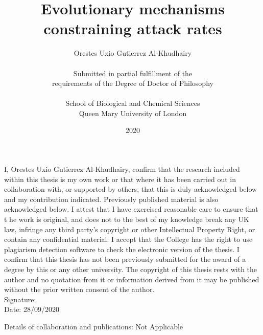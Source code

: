 \documentclass[a4paper]{report}
\def\setcounter#1#2{}
\begin{document}

\title{Evolutionary mechanisms constraining attack rates}
\author{Orestes Uxio Gutierrez Al-Khudhairy \\
\\
Submitted in partial fulfillment of the \\
requirements of the Degree of Doctor of Philosophy\\
\\
School of Biological and Chemical Sciences\\
Queen Mary University of London
}

\date{2020}

\setcounter{page}{1}
\maketitle

\newpage

I, Orestes Uxio Gutierrez Al-Khudhairy, confirm that the research included within this thesis is my own work or that where it has been carried out in collaboration with, or 
supported by others, that this is duly acknowledged below and my contribution indicated. Previously published material is also 
acknowledged below. I attest that I have exercised reasonable care to ensure that t
he work is original, and does not to the best 
of my knowledge break any UK law, infringe any third party’s copyright or other Intellectual Property Right, or contain any confidential material. I accept that the College has the 
right to use plagiarism detection software to 
check the electronic version of the thesis. 
I confirm that this thesis has not been previously submitted for the award of a 
degree by this or any other university. 
The copyright of this thesis rests with the 
author and no quotation from it or 
information derived from it may be published without the prior written consent 
of the author. \\

Signature: \\

Date: 28/09/2020

Details of collaboration and publications: Not Applicable


\newpage
\end{document}

